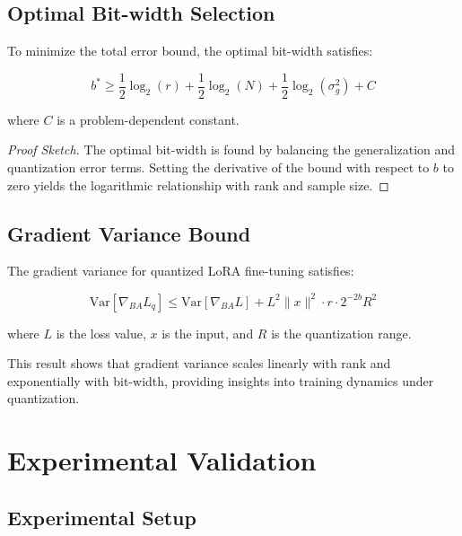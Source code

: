 \documentclass[10pt,twocolumn]{article}
\newcommand{\Var}{\text{Var}}
\begin{document}
\subsection{Optimal Bit-width Selection}

\begin{theorem}
\label{thm:optimal_bits}
To minimize the total error bound, the optimal bit-width satisfies:

\begin{equation}
b^* \geq \frac{1}{2}\log_2(r) + \frac{1}{2}\log_2(N) + \frac{1}{2}\log_2(\sigma_g^2) + C
\end{equation}

where $C$ is a problem-dependent constant.
\end{theorem}

\begin{proof}[Proof Sketch]
The optimal bit-width is found by balancing the generalization and quantization error terms. Setting the derivative of the bound with respect to $b$ to zero yields the logarithmic relationship with rank and sample size.
\end{proof}

\subsection{Gradient Variance Bound}

\begin{theorem}
\label{thm:gradient_variance}
The gradient variance for quantized LoRA fine-tuning satisfies:

\begin{equation}
\Var[\nabla_{BA} L_q] \leq \Var[\nabla_{BA} L] + L^2 \|x\|^2 \cdot r \cdot 2^{-2b} R^2
\end{equation}

where $L$ is the loss value, $x$ is the input, and $R$ is the quantization range.
\end{theorem}

This result shows that gradient variance scales linearly with rank and exponentially with bit-width, providing insights into training dynamics under quantization.

\section{Experimental Validation}

\subsection{Experimental Setup}
\end{document}
